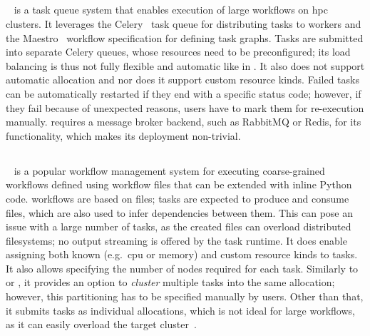 \begin{spacing}{1}
\subsection*{\merlin}
\merlin~\cite{merlin} is a task queue system that enables execution of large workflows on
\gls{hpc} clusters. It leverages the Celery~\cite{celery} task queue for
distributing tasks to workers and the Maestro~\cite{maestro} workflow specification for
defining task graphs. Tasks are submitted into separate Celery queues, whose resources need to be
preconfigured; its load balancing is thus not fully flexible and automatic like in
\hyperqueue{}. It also does not support automatic allocation and nor does it support custom
resource kinds. Failed tasks can be automatically restarted
if they end with a specific status code; however, if they fail because of unexpected reasons, users
have to mark them for re-execution manually. \merlin{} requires a message broker
backend, such as RabbitMQ or Redis, for its functionality, which makes its deployment non-trivial.

\subsection*{\snakemake}
\snakemake~\cite{snakemake} is a popular workflow management system for executing
coarse-grained workflows defined using workflow files that can be extended with inline Python code.
\snakemake{} workflows are based on files; tasks are expected to produce and consume
files, which are also used to infer dependencies between them. This can pose an issue with a large
number of tasks, as the created files can overload distributed filesystems; no output streaming is
offered by the task runtime. It does enable assigning both known (e.g.\ \gls{cpu} or
memory) and custom resource kinds to tasks. It also allows specifying the number of nodes
required for each task. Similarly to \pegasus{} or \autosubmit{}, it provides an
option to \emph{cluster} multiple tasks into the same allocation; however, this
partitioning has to be specified manually by users. Other than that, it submits tasks as individual
allocations, which is not ideal for large workflows, as it can easily overload the target
cluster~\cite{nersc-snakemake}.
\end{spacing}
